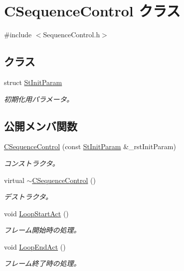 \hypertarget{class_c_sequence_control}{}\section{C\+Sequence\+Control クラス}
\label{class_c_sequence_control}


{\ttfamily \#include $<$Sequence\+Control.\+h$>$}

\subsection*{クラス}
\begin{DoxyCompactItemize}
\item 
struct \hyperlink{struct_c_sequence_control_1_1_st_init_param}{St\+Init\+Param}
\begin{DoxyCompactList}\small\item\em 初期化用パラメータ。 \end{DoxyCompactList}\end{DoxyCompactItemize}
\subsection*{公開メンバ関数}
\begin{DoxyCompactItemize}
\item 
\hyperlink{class_c_sequence_control_ad011ae31839cf8cc69d292bf16cf231d}{C\+Sequence\+Control} (const \hyperlink{struct_c_sequence_control_1_1_st_init_param}{St\+Init\+Param} \&\+\_\+rst\+Init\+Param)
\begin{DoxyCompactList}\small\item\em コンストラクタ。 \end{DoxyCompactList}\item 
virtual \hyperlink{class_c_sequence_control_a8735abbbdd83d4ef744ffb29fee7a450}{$\sim$\+C\+Sequence\+Control} ()
\begin{DoxyCompactList}\small\item\em デストラクタ。 \end{DoxyCompactList}\item 
void \hyperlink{class_c_sequence_control_ad4eb050fd932a4e69a1a7872342da3b2}{Loop\+Start\+Act} ()
\begin{DoxyCompactList}\small\item\em フレーム開始時の処理。 \end{DoxyCompactList}\item 
void \hyperlink{class_c_sequence_control_a42709cbc26a634d5e917587d581f9266}{Loop\+End\+Act} ()
\begin{DoxyCompactList}\small\item\em フレーム終了時の処理。 \end{DoxyCompactList}\end{DoxyCompactItemize}
